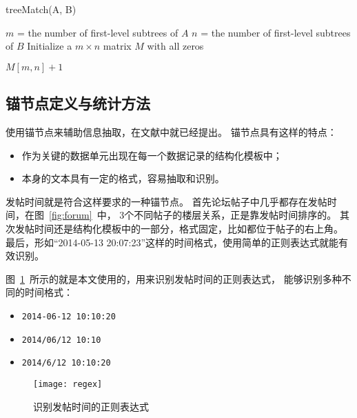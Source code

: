 \begin{algorithm}[htbp]
\caption{treeMatch(A, B)}
\label{algo:tree-match}

$m$ = the number of first-level subtrees of $A$ \;
$n$ = the number of first-level subtrees of $B$ \;
Initialize a $m \times n$ matrix $M$ with all zeros \;

\Return $M[m,n] + 1$ \;
\end{algorithm}

\subsection{锚节点定义与统计方法}
\label{subsec:anchor}

使用锚节点来辅助信息抽取，在文献\cite{song2010automatic}中就已经提出。
锚节点具有这样的特点：
\begin{itemize}
\item 作为关键的数据单元出现在每一个数据记录的结构化模板中；
\item 本身的文本具有一定的格式，容易抽取和识别。
\end{itemize}

发帖时间就是符合这样要求的一种锚节点。
首先论坛帖子中几乎都存在发帖时间，在图~\ref{fig:forum}~中，
3个不同帖子的楼层关系，正是靠发帖时间排序的。
其次发帖时间还是结构化模板中的一部分，格式固定，比如都位于帖子的右上角。
最后，形如“2014-05-13 20:07:23”这样的时间格式，使用简单的正则表达式就能有效识别。

图~\ref{fig:regex}~所示的就是本文使用的，用来识别发帖时间的正则表达式，
能够识别多种不同的时间格式：
\begin{itemize}
\item \texttt{2014-06-12 10:10:20}
\item \texttt{2014/06/12 10:10}
\item \texttt{2014/6/12 10:10:20}
\end{itemize}

\begin{figure}[htbp]
\centering
\texttt{[image: regex]}
\caption{识别发帖时间的正则表达式}
\label{fig:regex}
\end{figure}

